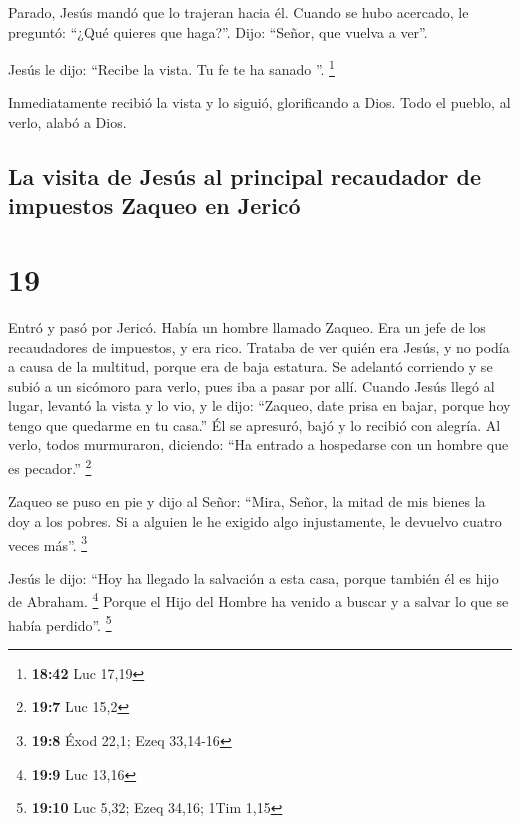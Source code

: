  Parado, Jesús mandó que lo trajeran hacia él. Cuando se
hubo acercado, le preguntó:  ``¿Qué quieres que haga?''.
Dijo: ``Señor, que vuelva a ver''.

 Jesús le dijo: ``Recibe la vista. Tu fe te ha sanado ''.
\footnote{\textbf{18:42} Luc 17,19}

 Inmediatamente recibió la vista y lo siguió,
glorificando a Dios. Todo el pueblo, al verlo, alabó a Dios.

\hypertarget{la-visita-de-jesuxfas-al-principal-recaudador-de-impuestos-zaqueo-en-jericuxf3}{%
\subsection{La visita de Jesús al principal recaudador de impuestos
Zaqueo en
Jericó}\label{la-visita-de-jesuxfas-al-principal-recaudador-de-impuestos-zaqueo-en-jericuxf3}}

\hypertarget{section-18}{%
\section{19}\label{section-18}}

 Entró y pasó por Jericó.  Había un hombre
llamado Zaqueo. Era un jefe de los recaudadores de impuestos, y era
rico.  Trataba de ver quién era Jesús, y no podía a causa
de la multitud, porque era de baja estatura.  Se adelantó
corriendo y se subió a un sicómoro para verlo, pues iba a pasar por
allí.  Cuando Jesús llegó al lugar, levantó la vista y lo
vio, y le dijo: ``Zaqueo, date prisa en bajar, porque hoy tengo que
quedarme en tu casa.''  Él se apresuró, bajó y lo recibió
con alegría.  Al verlo, todos murmuraron, diciendo: ``Ha
entrado a hospedarse con un hombre que es pecador.'' \footnote{\textbf{19:7}
  Luc 15,2}

 Zaqueo se puso en pie y dijo al Señor: ``Mira, Señor, la
mitad de mis bienes la doy a los pobres. Si a alguien le he exigido algo
injustamente, le devuelvo cuatro veces más''. \footnote{\textbf{19:8}
  Éxod 22,1; Ezeq 33,14-16}

 Jesús le dijo: ``Hoy ha llegado la salvación a esta casa,
porque también él es hijo de Abraham. \footnote{\textbf{19:9} Luc 13,16}
 Porque el Hijo del Hombre ha venido a buscar y a salvar
lo que se había perdido''. \footnote{\textbf{19:10} Luc 5,32; Ezeq
  34,16; 1Tim 1,15}

